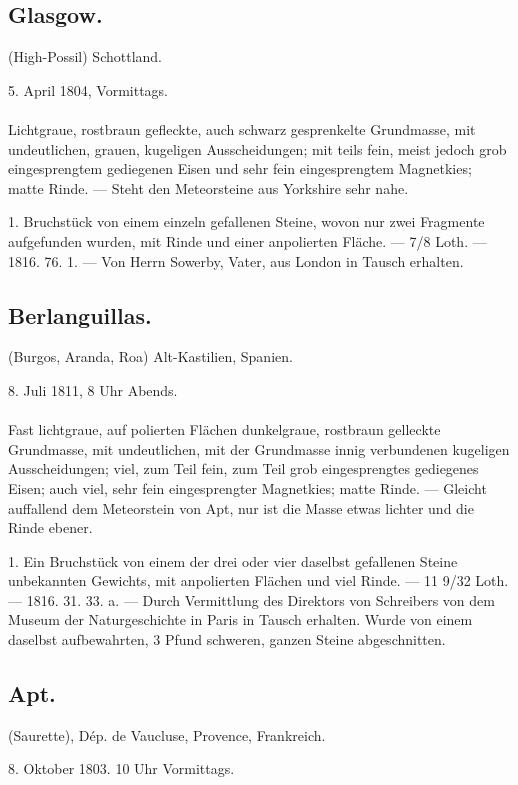 \documentclass[a4paper, 11pt, oneside, polutonikogreek, german]{article}
\begin{document}
\subsection{Glasgow.}
\begin{center}
\small
(High-Possil) Schottland.

5. April 1804, Vormittags.
\end{center}
\paragraph{}
Lichtgraue, rostbraun gefleckte, auch schwarz gesprenkelte Grundmasse, mit undeutlichen, grauen, kugeligen Ausscheidungen; mit teils fein, meist jedoch grob eingesprengtem gediegenen Eisen und sehr fein eingesprengtem Magnetkies; matte Rinde. — Steht den Meteorsteine aus Yorkshire sehr nahe.

1. Bruchstück von einem einzeln gefallenen Steine, wovon nur zwei Fragmente aufgefunden wurden, mit Rinde und einer anpolierten Fläche. — 7/8 Loth. — 1816. 76. 1. — Von Herrn Sowerby, Vater, aus London in Tausch erhalten.
\subsection{Berlanguillas.}
\begin{center}
\small
(Burgos, Aranda, Roa) Alt-Kastilien, Spanien.

8. Juli 1811, 8 Uhr Abends.
\end{center}
\paragraph{}
Fast lichtgraue, auf polierten Flächen dunkelgraue, rostbraun gelleckte Grundmasse, mit undeutlichen, mit der Grundmasse innig verbundenen kugeligen Ausscheidungen; viel, zum Teil fein, zum Teil grob eingesprengtes gediegenes Eisen; auch viel, sehr fein eingesprengter Magnetkies; matte Rinde. — Gleicht auffallend dem Meteorstein von Apt, nur ist die Masse etwas lichter und die Rinde ebener.

1. Ein Bruchstück von einem der drei oder vier daselbst gefallenen Steine unbekannten Gewichts, mit anpolierten Flächen und viel Rinde. — 11 9/32 Loth. — 1816. 31. 33. a. — Durch Vermittlung des Direktors von Schreibers von dem Museum der Naturgeschichte in Paris in Tausch erhalten. Wurde von einem daselbst aufbewahrten, 3 Pfund schweren, ganzen Steine abgeschnitten.
\subsection{Apt.}
\begin{center}
\small
(Saurette), Dép. de Vaucluse, Provence, Frankreich.

8. Oktober 1803. 10 Uhr Vormittags.
\end{center}
\end{document}
